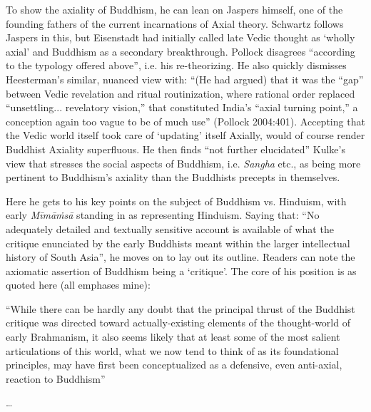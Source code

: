 To show the axiality of Buddhism, he can lean on Jaspers himself, one of the founding fathers of the current incarnations of Axial theory. Schwartz follows Jaspers in this, but Eisenstadt had initially called late Vedic thought as ‘wholly axial’ and Buddhism as a secondary breakthrough. Pollock disagrees “according to the typology offered above”, i.e. his re-theorizing. He also quickly dismisses Heesterman’s similar, nuanced view with: “(He had argued) that it was the “gap” between Vedic revelation and ritual routinization, where rational order replaced “unsettling... revelatory vision,” that constituted India’s “axial turning point,” a conception again too vague to be of much use” (Pollock 2004:401). Accepting that the Vedic world itself took care of ‘updating’ itself Axially, would of course render Buddhist Axiality superfluous. He then finds “not further elucidated” Kulke’s view that stresses the social aspects of Buddhism, i.e. \textit{Sangha} etc., as being more pertinent to Buddhism’s axiality than the Buddhists precepts in themselves.

\vspace{.1cm}

Here he gets to his key points on the subject of Buddhism vs. Hinduism, with early \textit{Mīmāṁsā} standing in as representing Hinduism. Saying that: “No adequately detailed and textually sensitive account is available of what the critique enunciated by the early Buddhists meant within the larger intellectual history of South Asia”, he moves on to lay out its outline. Readers can note the axiomatic assertion of Buddhism being a ‘critique’. The core of his position is as quoted here (all emphases mine):

\vspace{.1cm}

\begin{myquote}
“While there can be hardly any doubt that the principal thrust of the Buddhist critique was directed toward actually-existing elements of the thought-world of early Brahmanism, it also seems likely that at least some of the most salient articulations of this world, what we now tend to think of as its foundational principles, may have first been conceptualized as a defensive, even anti-axial, reaction to Buddhism”
\end{myquote}

\vspace{.1cm}

\begin{myquote}
…
\end{myquote}

